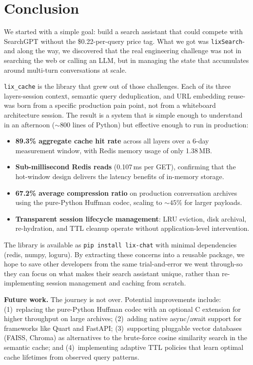 \documentclass[conference]{IEEEtran}
\begin{document}
\section{Conclusion}
\label{sec:conclusion}

We started with a simple goal: build a search assistant that could compete with SearchGPT without the \$0.22-per-query price tag. What we got was \texttt{lixSearch}-and along the way, we discovered that the real engineering challenge was not in searching the web or calling an LLM, but in managing the state that accumulates around multi-turn conversations at scale.

\texttt{lix\_cache} is the library that grew out of those challenges. Each of its three layers-session context, semantic query deduplication, and URL embedding reuse-was born from a specific production pain point, not from a whiteboard architecture session. The result is a system that is simple enough to understand in an afternoon (${\sim}800$ lines of Python) but effective enough to run in production:

\begin{itemize}
\item \textbf{89.3\% aggregate cache hit rate} across all layers over a 6-day measurement window, with Redis memory usage of only 1.38\,MB.
\item \textbf{Sub-millisecond Redis reads} (0.107\,ms per GET), confirming that the hot-window design delivers the latency benefits of in-memory storage.
\item \textbf{67.2\% average compression ratio} on production conversation archives using the pure-Python Huffman codec, scaling to ${\sim}45\%$ for larger payloads.
\item \textbf{Transparent session lifecycle management}: LRU eviction, disk archival, re-hydration, and TTL cleanup operate without application-level intervention.
\end{itemize}

The library is available as \texttt{pip install lix-chat} with minimal dependencies (redis, numpy, loguru). By extracting these concerns into a reusable package, we hope to save other developers from the same trial-and-error we went through-so they can focus on what makes their search assistant unique, rather than re-implementing session management and caching from scratch.

\textbf{Future work.} The journey is not over. Potential improvements include: (1)~replacing the pure-Python Huffman codec with an optional C extension for higher throughput on large archives; (2)~adding native async/await support for frameworks like Quart and FastAPI; (3)~supporting pluggable vector databases (FAISS, Chroma) as alternatives to the brute-force cosine similarity search in the semantic cache; and (4)~implementing adaptive TTL policies that learn optimal cache lifetimes from observed query patterns.
\end{document}
